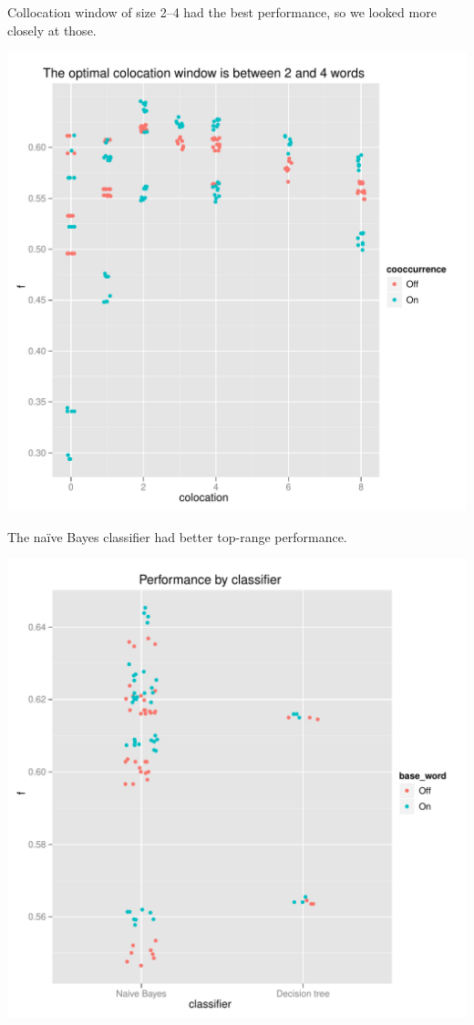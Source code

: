 \documentclass{article}
\newcommand{\naive}{na\"ive}
\begin{document}
Collocation window of size 2--4 had the best performance, so we looked more closely at those.

\includegraphics[width=\textwidth]{pg_0002}

The \naive{} Bayes classifier had better top-range performance.

\includegraphics[width=\textwidth]{pg_0003}
\end{document}
